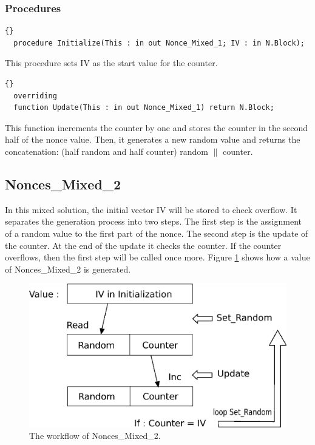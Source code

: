 
\subsubsection*{Procedures}
\begin{lstlisting}{}
  procedure Initialize(This : in out Nonce_Mixed_1; IV : in N.Block);
\end{lstlisting}
This procedure sets IV as the start value for the counter.

\hhline
\begin{lstlisting}{}
  overriding
  function Update(This : in out Nonce_Mixed_1) return N.Block;
\end{lstlisting}
This function increments the counter by one and stores the counter in
the second half of the nonce value. Then, it generates a new random
value and returns the concatenation: (half random and half counter)
random $\parallel$ counter.



\subsection*{Nonces\_Mixed\_2}
In this mixed solution, the initial vector IV will be stored to check
overflow. It separates the generation process into two steps. The
first step is the assignment of a random value to the first part of
the nonce. The second step is the update of the counter. At the end of
the update it checks the counter. If the counter overflows, then the
first step will be called once more. Figure \ref{Nonce2} shows how a
value of Nonces\_Mixed\_2 is generated.
\begin{figure}[h]
\centering
\includegraphics[scale=0.9]{./images/Nonce_Mixed_2}
\caption{The workflow of Nonces\_Mixed\_2.}\label{Nonce2}
\end{figure}

